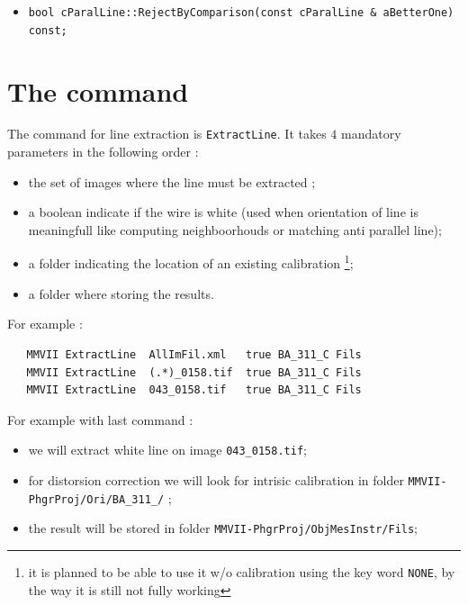 \begin{itemize}
   \item  {\tt bool cParalLine::RejectByComparison(const cParalLine \& aBetterOne) const;}
\end{itemize}



\section{The \PPP command }

The command for line extraction is {\tt ExtractLine}. It takes $4$  mandatory parameters  in the following order :


\begin{itemize}
   \item  the set of images where the line must be extracted ;
   \item  a boolean indicate if the wire is white  (used when orientation of line is meaningfull like computing neighboorhouds
          or matching anti parallel line);
   \item  a folder indicating the location of an existing calibration  \footnote{it is planned to be able to use
          it w/o calibration using the key word {\tt NONE}, by the way it is still not fully working};
   \item  a folder where storing the results.
\end{itemize}

For example :

\begin{verbatim}
   MMVII ExtractLine  AllImFil.xml   true BA_311_C Fils 
   MMVII ExtractLine  (.*)_0158.tif  true BA_311_C Fils 
   MMVII ExtractLine  043_0158.tif   true BA_311_C Fils 
\end{verbatim}

For example with last command :

\begin{itemize}
    \item we will extract white line on image {\tt 043\_0158.tif};

    \item for distorsion correction we will look for intrisic calibration in 
          folder {\tt MMVII-PhgrProj/Ori/BA\_311\_/} ;

    \item the result will be stored in folder {\tt MMVII-PhgrProj/ObjMesInstr/Fils};
\end{itemize}

